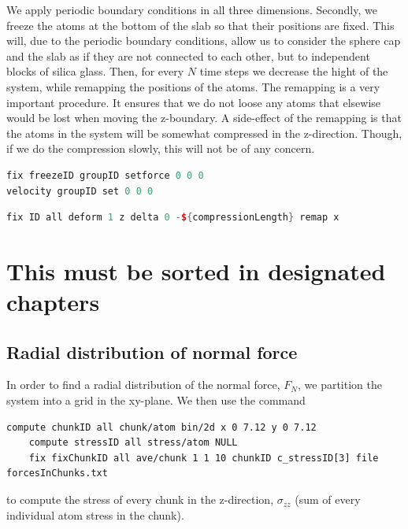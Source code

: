 \documentclass[twoside,english]{uiofysmaster}
\begin{document}
We apply periodic boundary conditions in all three dimensions. 
Secondly, we freeze the atoms at the bottom of the slab so that their positions are fixed. 
This will, due to the periodic boundary conditions, allow us to consider the sphere cap and the slab as if they are not connected to each other, but to independent blocks of silica glass.  
Then, for every $N$ time steps we decrease the hight of the system, while remapping the positions of the atoms. 
The remapping is a very important procedure. 
It ensures that we do not loose any atoms that elsewise would be lost when moving the z-boundary. 
A side-effect of the remapping is that the atoms in the system will be somewhat compressed in the z-direction. 
Though, if we do the compression slowly, this will not be of any concern. 

\begin{lstlisting}[caption={LAMMPS commands for hard coding the forces and velocities of atoms within a specific group. Effectively freezing them.}, label={Deform}, language=c++]
fix freezeID groupID setforce 0 0 0
velocity groupID set 0 0 0
\end{lstlisting}

\begin{lstlisting}[caption={LAMMPS command for changing the size of the simulation box.}, label={Deform}, language=c++]
fix ID all deform 1 z delta 0 -${compressionLength} remap x
\end{lstlisting}
 



\chapter{This must be sorted in designated chapters}

\section{Radial distribution of normal force}
In order to find a radial distribution of the normal force, $F_N$, we partition the system into a grid in  the xy-plane. We then use the command 

\begin{lstlisting}[language=LammpsInput]
	compute chunkID all chunk/atom bin/2d x 0 7.12 y 0 7.12
	compute stressID all stress/atom NULL
	fix fixChunkID all ave/chunk 1 1 10 chunkID c_stressID[3] file forcesInChunks.txt
\end{lstlisting} 
to compute the stress of every chunk in the z-direction, $\sigma_{zz}$ (sum of every individual atom stress in the chunk). 
\end{document}
